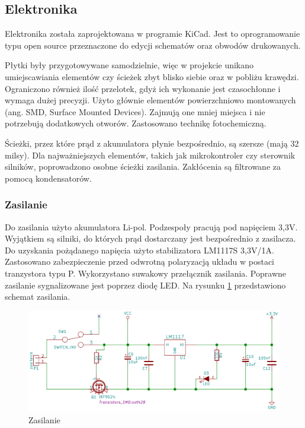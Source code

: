 \documentclass[12pt,a4paper]{article}
\begin{document}
\subsection{Elektronika}
Elektronika została zaprojektowana w programie KiCad. Jest to oprogramowanie typu open source przeznaczone do edycji schematów oraz obwodów drukowanych. 

Płytki były przygotowywane samodzielnie, więc w projekcie unikano umiejscawiania elementów czy ścieżek zbyt blisko siebie oraz w pobliżu krawędzi. Ograniczono również ilość przelotek, gdyż ich wykonanie jest czasochłonne i wymaga dużej precyzji. Użyto głównie elementów powierzchniowo montowanych (ang. SMD, Surface Mounted Devices). Zajmują one mniej miejsca i nie potrzebują dodatkowych otworów. Zastosowano technikę fotochemiczną.

Ścieżki, przez które prąd z akumulatora płynie bezpośrednio, są szersze (mają 32 milsy). Dla najważniejszych elementów, takich jak mikrokontroler czy sterownik silników, poprowadzono osobne ścieżki zasilania. Zakłócenia są filtrowane za pomocą kondensatorów.


\subsubsection{Zasilanie}
Do zasilania użyto akumulatora Li-pol. Podzespoły pracują pod napięciem 3,3V. Wyjątkiem są silniki, do których prąd dostarczany jest bezpośrednio z zasilacza. Do uzyskania pożądanego napięcia użyto stabilizatora LM1117S 3,3V/1A. Zastosowano zabezpieczenie przed odwrotną polaryzacją układu w postaci tranzystora typu P. Wykorzystano suwakowy przełącznik zasilania. Poprawne zasilanie sygnalizowane jest poprzez diodę LED. 
Na rysunku \ref{fig:zasilanie} przedstawiono schemat zasilania.
%
\begin{figure}[tp]
\centering
\includegraphics[width=1\textwidth]{figures/zasilanie.png}
\caption{Zasilanie \label{fig:zasilanie}}
\end{figure}
\end{document}
